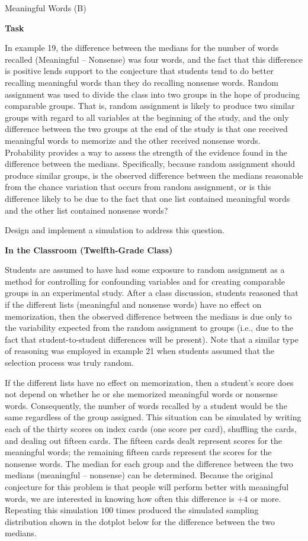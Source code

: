 \TriExample
  {
    Meaningful Words (B)
  }
  {
    \textbf{Task}

    In example 19, the difference between the medians for the number of words recalled (Meaningful -- Nonsense) was four words, and the fact that this difference is positive lends support to the conjecture that students tend to do better recalling meaningful words than they do recalling nonsense words. Random assignment was used to divide the class into two groups in the hope of producing comparable groups. That is, random assignment is likely to produce two similar groups with regard to all variables at the beginning of the study, and the only difference between the two groups at the end of the study is that one received meaningful words to memorize and the other received nonsense words. Probability provides a way to assess the strength of the evidence found in the difference between the medians. Specifically, because random assignment should produce similar groups, is the observed difference between the medians reasonable from the chance variation that occurs from random assignment, or is this difference likely to be due to the fact that one list contained meaningful words and the other list contained nonsense words?

    Design and implement a simulation to address this question.

    \textbf{In the Classroom (Twelfth-Grade Class)}

    Students are assumed to have had some exposure to random assignment as a method for controlling for confounding variables and for creating comparable groups in an experimental study. After a class discussion, students reasoned that if the different lists (meaningful and nonsense words) have no effect on memorization, then the observed difference between the medians is due only to the variability expected from the random assignment to groups (i.e., due to the fact that student-to-student differences will be present). Note that a similar type of reasoning was employed in example 21 when students assumed that the selection process was truly random.

    If the different lists have no effect on memorization, then a student's score does not depend on whether he or she memorized meaningful words or nonsense words. Consequently, the number of words recalled by a student would be the same regardless of the group assigned. This situation can be simulated by writing each of the thirty scores on index cards (one score per card), shuffling the cards, and dealing out fifteen cards. The fifteen cards dealt represent scores for the meaningful words; the remaining fifteen cards represent the scores for the nonsense words. The median for each group and the difference between the two medians (meaningful -- nonsense) can be determined. Because the original conjecture for this problem is that people will perform better with meaningful words, we are interested in knowing how often this difference is $+4$ or more. Repeating this simulation $100$ times produced the simulated sampling distribution shown in the dotplot below for the difference between the two medians.

}
